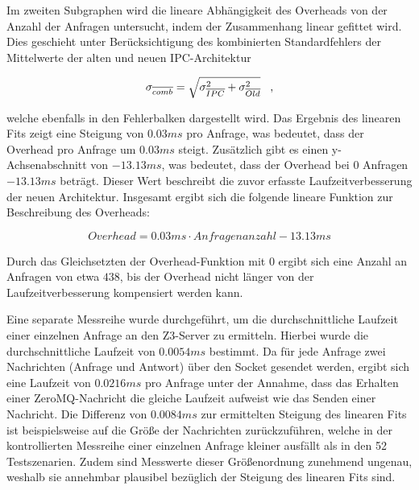 Im zweiten Subgraphen wird die lineare Abhängigkeit des Overheads von der Anzahl der Anfragen untersucht, indem der Zusammenhang linear gefittet wird.
Dies geschieht unter Berücksichtigung des kombinierten Standardfehlers der Mittelwerte der alten und neuen IPC-Architektur

\begin{equation}
    \sigma_{\overline{comb}} = \sqrt{\sigma_{\overline{IPC}}^2 + \sigma_{\overline{Old}}^2} \hspace{0.3cm},
\end{equation}

welche ebenfalls in den Fehlerbalken dargestellt wird.
Das Ergebnis des linearen Fits zeigt eine Steigung von $0.03 ms$ pro Anfrage, was bedeutet, dass der Overhead pro Anfrage um $0.03 ms$ steigt.
Zusätzlich gibt es einen y-Achsenabschnitt von $-13.13 ms$, was bedeutet, dass der Overhead bei $0$ Anfragen $-13.13 ms$ beträgt.
Dieser Wert beschreibt die zuvor erfasste Laufzeitverbesserung der neuen Architektur.
Insgesamt ergibt sich die folgende lineare Funktion zur Beschreibung des Overheads:

\begin{equation}
    Overhead = 0.03ms \cdot Anfragenanzahl - 13.13ms
\end{equation}

Durch das Gleichsetzten der Overhead-Funktion mit $0$ ergibt sich eine Anzahl an Anfragen von etwa $438$, bis der Overhead nicht länger von der Laufzeitverbesserung kompensiert werden kann.

Eine separate Messreihe wurde durchgeführt, um die durchschnittliche Laufzeit einer einzelnen Anfrage an den Z3-Server zu ermitteln.
Hierbei wurde die durchschnittliche Laufzeit von $0.0054 ms$ bestimmt.
Da für jede Anfrage zwei Nachrichten (Anfrage und Antwort) über den Socket gesendet werden, ergibt sich eine Laufzeit von $0.0216 ms$ pro Anfrage
unter der Annahme, dass das Erhalten einer ZeroMQ-Nachricht die gleiche Laufzeit aufweist wie das Senden einer Nachricht.
Die Differenz von $0.0084 ms$ zur ermittelten Steigung des linearen Fits ist beispielsweise auf die Größe der Nachrichten zurückzuführen, welche
in der kontrollierten Messreihe einer einzelnen Anfrage kleiner ausfällt als in den 52 Testszenarien.
Zudem sind Messwerte dieser Größenordnung zunehmend ungenau, weshalb sie annehmbar plausibel bezüglich der Steigung des linearen Fits sind.


